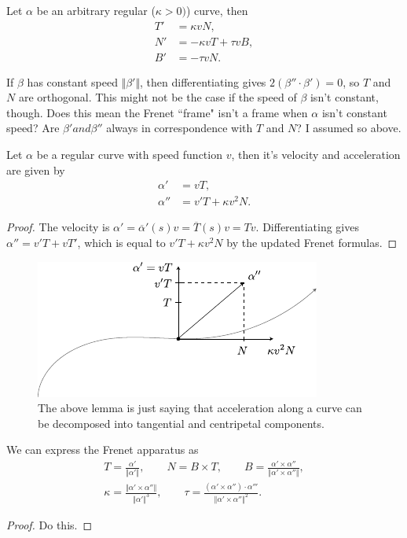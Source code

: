\documentclass[twoside,10pt]{report}
\begin{document}
\begin{thrm}[]
	Let $\alpha$ be an arbitrary regular ($\kappa>0)$) curve, then
\begin{align*}
	T' &= \kappa v N, \\
	N' &= -\kappa v T + \tau v B, \\
	B' &= -\tau v N.
\end{align*}
\end{thrm}

If $\beta$ has constant speed $\Vert{\beta'}\Vert$, then differentiating gives $2(\beta''\cdot \beta') = 0$, so $T$ and $N$ are orthogonal. This might not be the case if the speed of $\beta$ isn't constant, though. {\color{red}Does this mean the Frenet ``frame" isn't a frame when $\alpha$ isn't constant speed?} {\color{red}Are $\beta' and \beta''$ always in correspondence with $T$ and $N$? I assumed so above.}

\begin{lem}
	Let $\alpha$ be a regular curve with speed function $v$, then it's velocity and acceleration are given by
	\begin{align*}
		\alpha' &= vT, \\
		\alpha'' &= v'T + \kappa v^2 N.
	\end{align*}
\end{lem}
\begin{proof}
	The velocity is $\alpha' =\overline{\alpha}'(s)v = \overline{T}(s)v = Tv$. Differentiating gives $\alpha''=v'T + vT'$, which is equal to $v'T + \kappa v^2 N$ by the updated Frenet formulas.
\end{proof}

\begin{figure}[H]
	\centering
	\includegraphics[scale=1.5]{fig/frenet2.pdf}
	\caption{The above lemma is just saying that acceleration along a curve can be decomposed into tangential and centripetal components.}
\end{figure}


\begin{thrm}[]
We can express the Frenet apparatus as
\begin{gather*}
	T = \frac{\alpha'}{\Vert{\alpha'}\Vert} ,\quad\quad N = B \times T,\quad\quad B = \frac{\alpha' \times \alpha''}{\Vert{\alpha' \times \alpha''}\Vert} ,\\
	\kappa = \frac{\Vert{\alpha' \times \alpha''}\Vert}{\Vert{\alpha'}\Vert^3} ,\quad\quad \tau = \frac{(\alpha' \times \alpha'')\cdot \alpha'''}{\Vert{\alpha'\times \alpha''}\Vert^2} .
\end{gather*}
\end{thrm}
\begin{proof}
	{\color{red}Do this.}
\end{proof}
\end{document}
